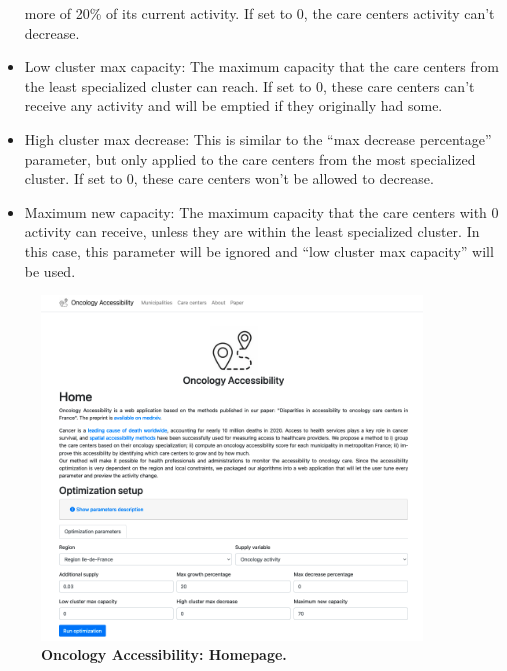 \begin{itemize}
          more of 20\% of its current activity. If set to 0, the care centers activity
          can't decrease.
    \item Low cluster max capacity: The maximum capacity that the care centers
          from the least specialized cluster can reach. If set to 0, these care
          centers can't receive any activity and will be emptied if they originally
          had some.
    \item High cluster max decrease: This is similar to the ``max decrease
          percentage'' parameter, but only applied to the care centers from the most
          specialized cluster. If set to 0, these care centers won't be allowed to
          decrease.
    \item Maximum new capacity: The maximum capacity that the care centers with
          0 activity can receive, unless they are within the least specialized
          cluster. In this case, this parameter will be ignored and ``low cluster max
          capacity'' will be used.
\end{itemize}

\begin{figure}[H]
    \includegraphics[width=0.9\textwidth]{images/oncology-accessibility/home.png}
    \centering
    \caption{
        \textbf{Oncology Accessibility: Homepage.}
    }
    \label{fig:optim-form}
\end{figure}

